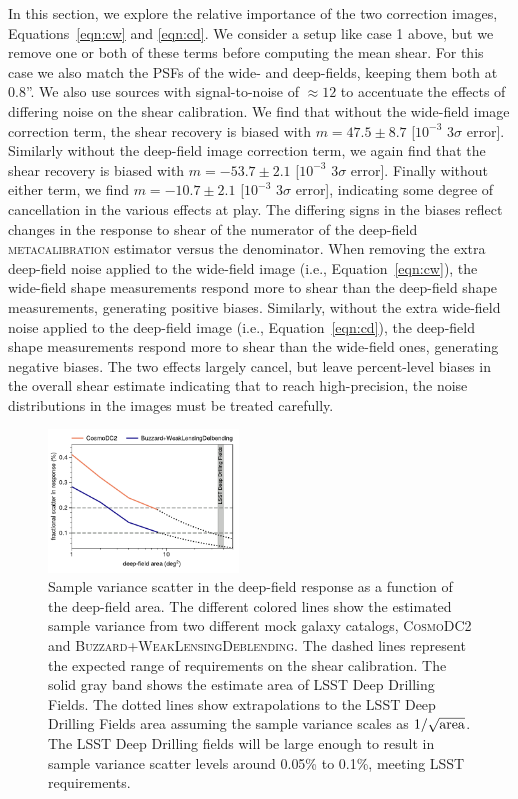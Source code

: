 \documentclass[twocolumn]{openjournal}
\makeatletter
\newcommand{\mcal}{\textsc{metacalibration}\@\xspace}
\newcommand{\descwl}{\textsc{WeakLensingDeblending}\@\xspace}
\newcommand{\cosmodctwo}{\textsc{CosmoDC2}\@\xspace}
\newcommand{\buzzard}{\textsc{Buzzard}\@\xspace}
\makeatother
\begin{document}
In this section, we explore the relative importance of the two correction images,
Equations~\ref{eqn:cw} and \ref{eqn:cd}. We consider a setup like case 1 above, but we
remove one or both of these terms before computing the mean shear. For this case we also
match the PSFs of the wide- and deep-fields, keeping them both at 0.8''. We also use
sources with signal-to-noise of $\approx12$ to accentuate the effects of differing noise
on the shear calibration. We find that without the wide-field image correction term, the
shear recovery is biased with $m=47.5\pm8.7$ [$10^{-3}$ $3\sigma$ error]. Similarly
without the deep-field image correction term, we again find that the shear recovery is biased
with $m=-53.7\pm2.1$ [$10^{-3}$ $3\sigma$ error]. Finally without either term, we find
$m=-10.7\pm2.1$ [$10^{-3}$ $3\sigma$ error], indicating some degree of cancellation in
the various effects at play. The differing signs in the biases reflect changes in the
response to shear of the numerator of the deep-field \mcal estimator versus the
denominator. When removing the extra deep-field noise applied to the wide-field image
(i.e., Equation~\ref{eqn:cw}), the wide-field shape measurements respond more to shear
than the deep-field shape measurements, generating positive biases. Similarly, without
the extra wide-field noise applied to the deep-field image (i.e.,
Equation~\ref{eqn:cd}), the deep-field shape measurements respond more to shear than the
wide-field ones, generating negative biases. The two effects largely cancel, but leave
percent-level biases in the overall shear estimate indicating that to reach
high-precision, the noise distributions in the images must be treated carefully.


\begin{figure}
    \centering
    \includegraphics[width=0.45\textwidth]{sample_var.pdf}
    \caption{
      Sample variance scatter in the deep-field response as a function of the
      deep-field area. The different colored lines show the estimated sample variance
      from two different mock galaxy catalogs, \cosmodctwo and \buzzard+\descwl. The
      dashed lines represent the expected range of requirements on the shear
      calibration. The solid gray band shows the estimate area of LSST Deep Drilling
      Fields. The dotted lines show extrapolations to the LSST Deep Drilling Fields
      area assuming the sample variance scales as $1/\sqrt{\rm area}$. The LSST Deep
      Drilling fields will be large enough to result in sample variance scatter levels
      around 0.05\% to 0.1\%, meeting LSST requirements.
    }
    \label{fig:sample_variance}
\end{figure}
\end{document}
